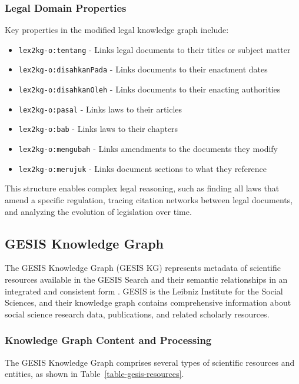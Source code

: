 \subsubsection{Legal Domain Properties}
Key properties in the modified legal knowledge graph include:

\begin{itemize}
    \item \texttt{lex2kg-o:tentang} - Links legal documents to their titles or subject matter
    \item \texttt{lex2kg-o:disahkanPada} - Links documents to their enactment dates
    \item \texttt{lex2kg-o:disahkanOleh} - Links documents to their enacting authorities
    \item \texttt{lex2kg-o:pasal} - Links laws to their articles
    \item \texttt{lex2kg-o:bab} - Links laws to their chapters
    \item \texttt{lex2kg-o:mengubah} - Links amendments to the documents they modify
    \item \texttt{lex2kg-o:merujuk} - Links document sections to what they reference
\end{itemize}

This structure enables complex legal reasoning, such as finding all laws that amend a specific regulation, tracing citation networks between legal documents, and analyzing the evolution of legislation over time.

\subsection{GESIS Knowledge Graph}
\label{gesis-kg}

The GESIS Knowledge Graph (GESIS KG) represents metadata of scientific resources available in the GESIS Search and their semantic relationships in an integrated and consistent form \citep{biswas2025gesis}. GESIS is the Leibniz Institute for the Social Sciences, and their knowledge graph contains comprehensive information about social science research data, publications, and related scholarly resources.

\subsubsection{Knowledge Graph Content and Processing}
The GESIS Knowledge Graph comprises several types of scientific resources and entities, as shown in Table~\ref{table-gesis-resources}.

